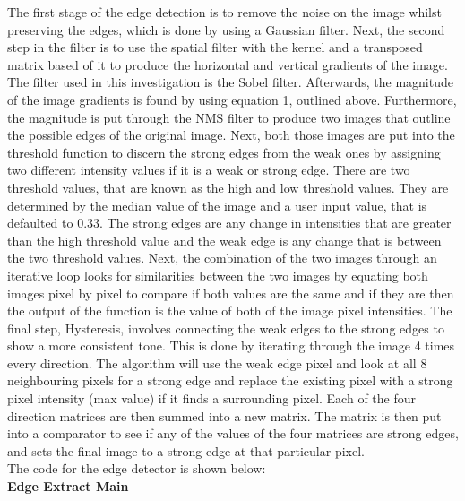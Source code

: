 \documentclass{article}
\begin{document}
	The first stage of the edge detection is to remove the noise on the image whilst preserving the edges, which is done by using a Gaussian filter. Next, the second step in the filter is to use the spatial filter with the kernel and a transposed matrix based of it to produce the horizontal and vertical gradients of the image. The filter used in this investigation is the Sobel filter. Afterwards, the magnitude of the image gradients is found by using equation 1, outlined above. Furthermore, the magnitude is put through the NMS filter to produce two images that outline the possible edges of the original image. Next, both those images are put into the threshold function to discern the strong edges from the weak ones by assigning two different intensity values if it is a weak or strong edge. There are two threshold values, that are known as the high and low threshold values. They are determined by the median value of the image and a user input value, that is defaulted to 0.33. The strong edges are any change in intensities that are greater than the high threshold value and the weak edge is any change that is between the two threshold values. Next, the combination of the two images through an iterative loop looks for similarities between the two images by equating both images pixel by pixel to compare if both values are the same and if they are then the output of the function is the value of both of the image pixel intensities. The final step, Hysteresis, involves connecting the weak edges to the strong edges to show a more consistent tone. This is done by iterating through the image 4 times every direction. The algorithm will use the weak edge pixel and look at all 8 neighbouring pixels for a strong edge and replace the existing pixel with a strong pixel intensity (max value) if it finds a surrounding pixel. Each of the four direction matrices are then summed into a new matrix. The matrix is then put into a comparator to see if any of the values of the four matrices are strong edges, and sets the final image to a strong edge at that particular pixel.\\
	
	\noindent The code for the edge detector is shown below:\\
	
	\noindent \textbf{Edge Extract Main}
	
	\smallskip
	
\end{document}
